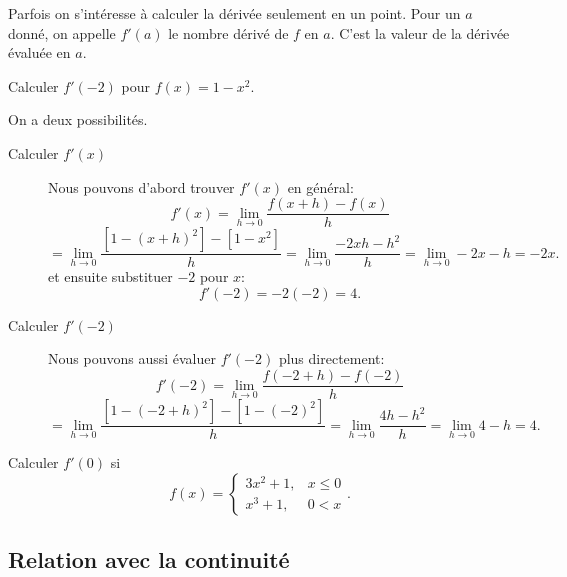 \documentclass[a4paper,12pt]{article}
\begin{document}
Parfois on s'intéresse à calculer la dérivée seulement en un point. Pour un $a$ donné, on appelle $f'(a)$ le nombre dérivé de $f$ en $a$. C'est la valeur de la dérivée évaluée en $a$. 
\begin{exemple}
\tcblower 
Calculer $f'(-2)$ pour $f(x)=1-x^2$. 

On a deux possibilités. 
\begin{description}
	\item[Calculer $f'(x)$]
 Nous pouvons d'abord trouver $f'(x)$ en général:
$$f'(x) = \displaystyle\lim_{h \to 0} \dfrac{f(x+h) - f(x)}{h}$$
$$= \displaystyle\lim_{h \to 0} \dfrac{[1 - (x+h)^2] - [1 - x^2]}{h} = \displaystyle\lim_{h \to 0} \dfrac{-2xh - h^2}{h} = \displaystyle\lim_{h \to 0} -2x - h = -2x.$$
et ensuite substituer $-2$ pour $x$:
$$f'(-2) = -2(-2) = 4.$$

	\item[Calculer $f'(-2)$] 
Nous pouvons aussi évaluer $f'(-2)$ plus directement:
$$f'(-2) = \displaystyle\lim_{h \to 0} \dfrac{f(-2+h) - f(-2)}{h}$$
$$= \displaystyle\lim_{h \to 0} \dfrac{[1 - (-2+h)^2] - [1 - (-2)^2]}{h} = \displaystyle\lim_{h \to 0} \dfrac{4h - h^2}{h} = \displaystyle\lim_{h \to 0} 4 - h = 4.$$

\end{description}
\end{exemple}
\begin{exemple}
	\tcblower
Calculer $f'(0)$ si
$$f(x) = \begin{cases}
    3x^2 + 1, & x \le 0 \\
    x^3 + 1, & 0 < x \end{cases}.$$
    \vspace{10cm}
\end{exemple}
\subsection{Relation avec la continuité}
\end{document}
